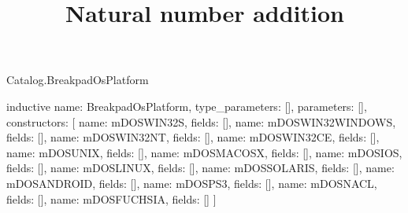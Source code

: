 \begin{lexlean}{Catalog.BreakpadOsPlatform}
\title{Natural number addition}
\begin{semanticmodule}
inductive{
  name: BreakpadOsPlatform,
  type_parameters: [],
  parameters: [],
  constructors: [
    {name: mDOSWIN32S, fields: []},
    {name: mDOSWIN32WINDOWS, fields: []},
    {name: mDOSWIN32NT, fields: []},
    {name: mDOSWIN32CE, fields: []},
    {name: mDOSUNIX, fields: []},
    {name: mDOSMACOSX, fields: []},
    {name: mDOSIOS, fields: []},
    {name: mDOSLINUX, fields: []},
    {name: mDOSSOLARIS, fields: []},
    {name: mDOSANDROID, fields: []},
    {name: mDOSPS3, fields: []},
    {name: mDOSNACL, fields: []},
    {name: mDOSFUCHSIA, fields: []}
  ]
}
\end{semanticmodule}
\end{lexlean}
